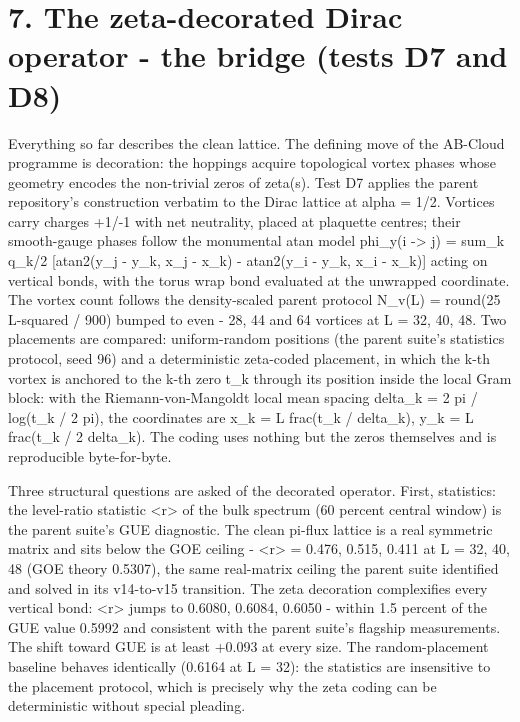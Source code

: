 \documentclass[11pt,a4paper]{article}
\begin{document}
\section{7. The zeta-decorated Dirac operator - the bridge (tests D7 and D8)}
Everything so far describes the clean lattice. The defining move of the AB-Cloud programme is decoration: the hoppings acquire topological vortex phases whose geometry encodes the non-trivial zeros of zeta(s). Test D7 applies the parent repository's construction verbatim to the Dirac lattice at alpha = 1/2. Vortices carry charges +1/-1 with net neutrality, placed at plaquette centres; their smooth-gauge phases follow the monumental atan model phi\_\allowbreak{}y(i -> j) = sum\_\allowbreak{}k q\_\allowbreak{}k/2 [atan2(y\_\allowbreak{}j - y\_\allowbreak{}k, x\_\allowbreak{}j - x\_\allowbreak{}k) - atan2(y\_\allowbreak{}i - y\_\allowbreak{}k, x\_\allowbreak{}i - x\_\allowbreak{}k)] acting on vertical bonds, with the torus wrap bond evaluated at the unwrapped coordinate. The vortex count follows the density-scaled parent protocol N\_\allowbreak{}v(L) = round(25 L-squared / 900) bumped to even - 28, 44 and 64 vortices at L = 32, 40, 48. Two placements are compared: uniform-random positions (the parent suite's statistics protocol, seed 96) and a deterministic zeta-coded placement, in which the k-th vortex is anchored to the k-th zero t\_\allowbreak{}k through its position inside the local Gram block: with the Riemann-von-Mangoldt local mean spacing delta\_\allowbreak{}k = 2 pi / log(t\_\allowbreak{}k / 2 pi), the coordinates are x\_\allowbreak{}k = L frac(t\_\allowbreak{}k / delta\_\allowbreak{}k), y\_\allowbreak{}k = L frac(t\_\allowbreak{}k / 2 delta\_\allowbreak{}k). The coding uses nothing but the zeros themselves and is reproducible byte-for-byte.

Three structural questions are asked of the decorated operator. First, statistics: the level-ratio statistic <r> of the bulk spectrum (60 percent central window) is the parent suite's GUE diagnostic. The clean pi-flux lattice is a real symmetric matrix and sits below the GOE ceiling - <r> = 0.476, 0.515, 0.411 at L = 32, 40, 48 (GOE theory 0.5307), the same real-matrix ceiling the parent suite identified and solved in its v14-to-v15 transition. The zeta decoration complexifies every vertical bond: <r> jumps to 0.6080, 0.6084, 0.6050 - within 1.5 percent of the GUE value 0.5992 and consistent with the parent suite's flagship measurements. The shift toward GUE is at least +0.093 at every size. The random-placement baseline behaves identically (0.6164 at L = 32): the statistics are insensitive to the placement protocol, which is precisely why the zeta coding can be deterministic without special pleading.
\end{document}
